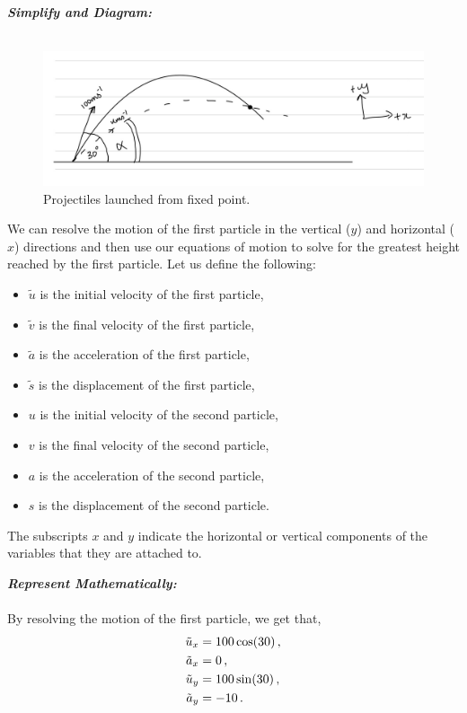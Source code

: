 \begin{subquestions}
\textbf{\textit{Simplify and Diagram:}} \\ \\
\begin{figure}[H]
	\begin{center}
		\includegraphics[scale=0.25]{../2008/figures/2008Jq6-1}
		\caption{\label{2008J:q6:Diagram1} Projectiles launched from fixed point.}
	\end{center}
\end{figure}
We can resolve the motion of the first particle in the vertical ($y$) and horizontal ($x$) directions and then use our equations of motion to solve for the greatest height reached by the first particle. Let us define the following:
\begin{itemize}
	\item $\tilde{u}$ is the initial velocity of the first particle,
	\item $\tilde{v}$ is the final velocity of the first particle,
	\item $\tilde{a}$ is the acceleration of the first particle,
	\item $\tilde{s}$ is the displacement of the first particle,
	\item $u$ is the initial velocity of the second particle,
	\item $v$ is the final velocity of the second particle,
	\item $a$ is the acceleration of the second particle,
	\item $s$ is the displacement of the second particle.
\end{itemize}
The subscripts $x$ and $y$ indicate the horizontal or vertical components of the variables that they are attached to.



\textbf{\textit{Represent Mathematically:}} \\ \\
By resolving the motion of the first particle, we get that,
\begin{align}
	\tilde{u}_x & = 100 \cos(30) \,, \nonumber \\
	\tilde{a}_x & = 0 \,, \nonumber \\
	\tilde{u}_y & = 100 \sin(30) \,, \nonumber \\
	\tilde{a}_y & = -10 \,. 
\end{align}


\end{subquestions}
